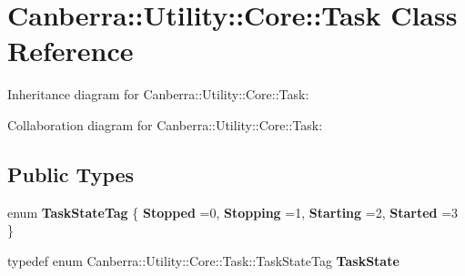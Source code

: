 \hypertarget{class_canberra_1_1_utility_1_1_core_1_1_task}{}\section{Canberra\+:\+:Utility\+:\+:Core\+:\+:Task Class Reference}
\label{class_canberra_1_1_utility_1_1_core_1_1_task}


Inheritance diagram for Canberra\+:\+:Utility\+:\+:Core\+:\+:Task\+:


Collaboration diagram for Canberra\+:\+:Utility\+:\+:Core\+:\+:Task\+:
\subsection*{Public Types}
\begin{DoxyCompactItemize}
\item 
\mbox{\label{class_canberra_1_1_utility_1_1_core_1_1_task_af3df2c64e08ed6ba4f7d60ff26a5908a}} 
enum {\bfseries Task\+State\+Tag} \{ {\bfseries Stopped} =0, 
{\bfseries Stopping} =1, 
{\bfseries Starting} =2, 
{\bfseries Started} =3
 \}
\item 
\mbox{\label{class_canberra_1_1_utility_1_1_core_1_1_task_a9072440f50482734bafa54c9d24550ee}} 
typedef enum Canberra\+::\+Utility\+::\+Core\+::\+Task\+::\+Task\+State\+Tag {\bfseries Task\+State}
\end{DoxyCompactItemize}
